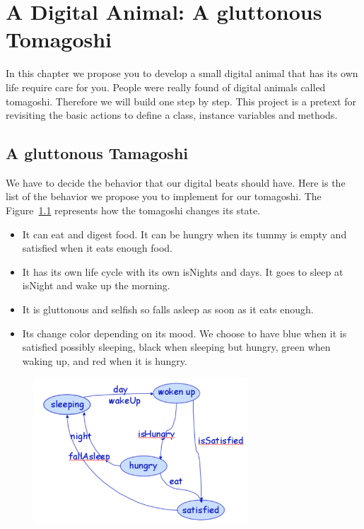 \documentclass[a4paper,10pt,twoside]{book}
\begin{document}
\fi
\sloppy

\chapter{A Digital Animal: A gluttonous Tomagoshi}\label{cha:toma}

In this chapter we propose you to develop a small digital animal that has its own life require care for you. 
People were really found of digital animals called tomagoshi. Therefore  we will build one step by step. 
This project is a pretext for revisiting the basic actions to define a class, instance variables and methods. 

\section{A gluttonous Tamagoshi }

We have to decide the behavior that our digital beats should have. 
Here is the list of the behavior we propose you to implement for our  tomagoshi. The Figure~\ref{fig:tomastate} represents how the tomagoshi changes its state. 
\begin{itemize}
\item It can eat and digest food. It can be hungry when its tummy is empty and satisfied when it eats enough food.
\item It has its own life cycle with its own isNights and days. It goes to sleep at isNight and wake up the morning. 
\item It is gluttonous and selfish so falls asleep as soon as it eats enough. 
\item Its change color depending on its mood.  
We choose to have blue when it is  satisfied possibly sleeping, black when sleeping but hungry, green when waking up, and red when it is hungry. 
\end{itemize}

\begin{figure}
\begin{center}
\includegraphics[width=8cm]{figures/tomastate}
\caption{\label{fig:tomastate}}
\end{center}
\end{figure}
\end{document}
